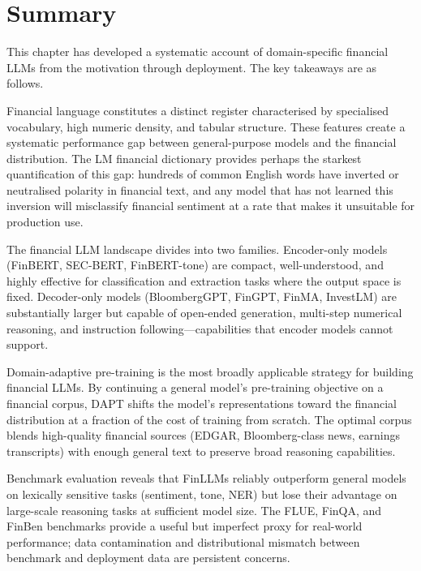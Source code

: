\section{Summary}
\label{sec:ch08-summary}

This chapter has developed a systematic account of domain-specific financial LLMs
from the motivation through deployment.  The key takeaways are as follows.

Financial language constitutes a distinct register characterised by specialised
vocabulary, high numeric density, and tabular structure.  These features create
a systematic performance gap between general-purpose models and the financial
distribution.  The LM financial dictionary \cite{loughran2011liability} provides
perhaps the starkest quantification of this gap: hundreds of common English words
have inverted or neutralised polarity in financial text, and any model that has not
learned this inversion will misclassify financial sentiment at a rate that makes
it unsuitable for production use.

The financial LLM landscape divides into two families.  Encoder-only models
(FinBERT, SEC-BERT, FinBERT-tone) are compact, well-understood, and highly
effective for classification and extraction tasks where the output space is fixed.
Decoder-only models (BloombergGPT, FinGPT, FinMA, InvestLM) are substantially
larger but capable of open-ended generation, multi-step numerical reasoning, and
instruction following---capabilities that encoder models cannot support.

Domain-adaptive pre-training \cite{gururangan2020dont} is the most broadly
applicable strategy for building financial LLMs.  By continuing a general model's
pre-training objective on a financial corpus, DAPT shifts the model's representations
toward the financial distribution at a fraction of the cost of training from scratch.
The optimal corpus blends high-quality financial sources (EDGAR, Bloomberg-class
news, earnings transcripts) with enough general text to preserve broad reasoning
capabilities.

Benchmark evaluation reveals that FinLLMs reliably outperform general models on
lexically sensitive tasks (sentiment, tone, NER) but lose their advantage on
large-scale reasoning tasks at sufficient model size.  The FLUE, FinQA, and FinBen
benchmarks provide a useful but imperfect proxy for real-world performance; data
contamination and distributional mismatch between benchmark and deployment data
are persistent concerns.

